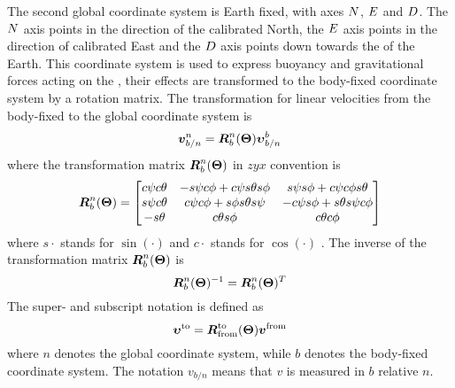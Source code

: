 The second global coordinate system is Earth fixed, with axes $N$, $E$ and $D$. The $N$ axis points in the direction of the calibrated North, the $E$ axis points in the direction of calibrated East and the $D$ axis points down towards the \abbrCG of the Earth.
This coordinate system is used to express buoyancy and gravitational forces acting on the \abbrROV, their effects are transformed to the body-fixed coordinate system by a rotation matrix. The transformation for linear velocities from the body-fixed to the global coordinate system is 
\begin{equation}
\boldsymbol{v}^n_{b/n} = \boldsymbol{R}^n_b(\boldsymbol{\Theta}) \boldsymbol{\upsilon}^b_{b/n}
\end{equation}
where the transformation matrix $\boldsymbol{R}^n_b(\boldsymbol{\Theta})$ in $zyx$ convention is 
\begin{equation}
\boldsymbol{R}^n_b(\boldsymbol{\Theta}) =\begin{bmatrix}
 c\psi c\theta & -s\psi c\phi + c\psi s\theta s\phi & s\psi s\phi + c\psi c\phi s \theta \\
 s\psi c\theta & c\psi c\phi + s\phi  s\theta s\psi & -c\psi s\phi + s\theta s\psi c\phi \\
 -s\theta & c\theta s\phi & c\theta c\phi
 \end{bmatrix} 
\end{equation}
where $s\cdot$ stands for $\sin(\cdot)$ and $c\cdot$ stands for $\cos(\cdot)$ \citep[p. 22]{fossen2011}. The inverse of the transformation matrix $\boldsymbol{R}^n_b(\boldsymbol{\Theta})$ is
\begin{equation}
\boldsymbol{R}^n_b(\boldsymbol{\Theta})^{-1} = \boldsymbol{R}^n_b(\boldsymbol{\Theta})^T
\end{equation}
The super- and subscript notation is defined as
\begin{equation}
\boldsymbol{\upsilon}^{\text{to}}=\boldsymbol{R}^{\text{to}}_{\text{from}}(\boldsymbol{\Theta})\boldsymbol{v}^{\text{from}}
\end{equation}
where $n$ denotes the global coordinate system, while $b$ denotes the body-fixed coordinate system.
The notation $v_{b/n}$ means that $v$ is measured in $b$ relative $n$.

